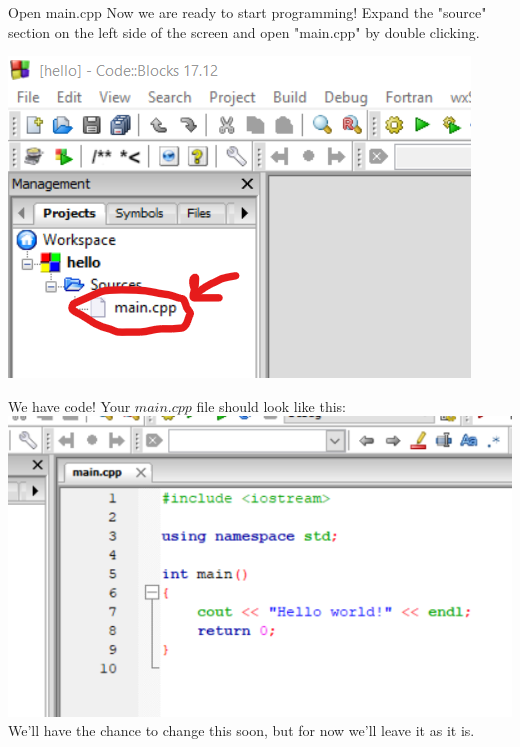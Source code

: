 \documentclass{beamer}
\begin{document}
\begin{frame}{Open main.cpp}
    Now we are ready to start programming! Expand the "source" section on the left side of the screen and open "main.cpp" by double clicking.
    
    \includegraphics[scale=1]{codeblockssetup5.png}
\end{frame}

\begin{frame}{We have code!}
Your $main.cpp$ file should look like this:
\includegraphics[scale=.7]{codeblockssetup6.png}
We'll have the chance to change this soon, but for now we'll leave it as it is.
    
\end{frame}
\end{document}
